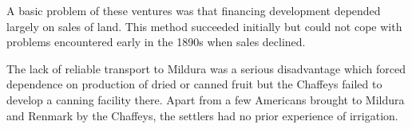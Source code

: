 A basic problem of these ventures was that financing development
depend\-ed largely on sales of land.  This method succeeded initially
but could not cope with problems encountered early in the 1890s when
sales declined.

The lack of reliable transport to Mildura was a serious disadvantage
which forced dependence on production of dried or canned fruit but the
Chaffeys failed to develop a canning facility there.  Apart from a few
Americans brought to Mildura and Renmark by the Chaffeys, the settlers
had no prior experience of irrigation.

